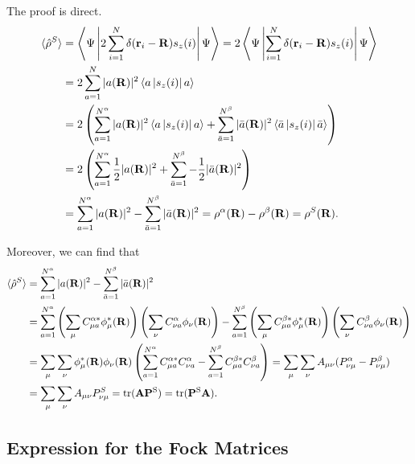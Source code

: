 \documentclass[a4paper]{book}
\newcounter{solution}[chapter]
\newcommand\tr[1]{\mathrm{tr(#1)}}
\newcommand{\bfR}{{\bf R}}
\begin{document}
	\begin{solution}
	
	The proof is direct.
	\begin{align*}
		\langle \hat{\rho}^S \rangle &= \left\langle \Psi \left| 2 \sum_{i=1}^N \delta( {\bf r}_i - {\bf R} )s_z(i) \right| \Psi \right\rangle = 2 \left\langle \Psi \left| \sum_{i=1}^N \delta( {\bf r}_i - {\bf R} )s_z(i) \right| \Psi \right\rangle \\
		&= 2 \sum_{ a=1 }^N | a( \bfR ) |^2 \left\langle a \left| s_z(i) \right| a \right\rangle \\
		&= 2 \left( \sum_{ a=1 }^{N^\alpha} | a( \bfR ) |^2 \left\langle a \left| s_z(i) \right| a \right\rangle + \sum_{ \bar{a}=1 }^{N^\beta} | \bar{a}( \bfR ) |^2 \left\langle \bar{a} \left| s_z(i) \right| \bar{a} \right\rangle \right) \\
		&= 2 \left( \sum_{ a=1 }^{N^\alpha} \frac{1}{2} | a( \bfR ) |^2 + \sum_{ \bar{a}=1 }^{N^\beta} -\frac{1}{2} | \bar{a}( \bfR ) |^2 \right) \\
		&= \sum_{ a=1 }^{N^\alpha} | a( \bfR ) |^2 - \sum_{ \bar{a}=1 }^{N^\beta} | \bar{a}( \bfR ) |^2 = \rho^\alpha ( \bfR ) - \rho^\beta ( \bfR ) = \rho^S ( \bfR ) .
	\end{align*}
	
	Moreover, we can find that
	\begin{align*}
		\langle \hat{\rho}^S \rangle &= \sum_{ a=1 }^{N^\alpha} | a( \bfR ) |^2 - \sum_{ \bar{a}=1 }^{N^\beta} | \bar{a}( \bfR ) |^2 \\
		&= \sum_{ a=1 }^{N^\alpha} \left( \sum_\mu C^{\alpha*}_{\mu a} \phi^*_\mu( \bfR ) \right) \left( \sum_\nu C^\alpha_{\nu a} \phi_\nu( \bfR ) \right) - \sum_{ a=1 }^{N^\beta} \left( \sum_\mu C^{\beta*}_{\mu a} \phi^*_\mu( \bfR ) \right) \left( \sum_\nu C^\beta_{\nu a} \phi_\nu( \bfR ) \right) \\
		&= \sum_\mu \sum_\nu \phi^*_\mu( \bfR ) \phi_\nu( \bfR ) \left( \sum_{ a=1 }^{N^\alpha} C^{\alpha*}_{\mu a} C^\alpha_{\nu a} - \sum_{ a=1 }^{N^\beta} C^{\beta*}_{\mu a} C^\beta_{\nu a} \right) = \sum_\mu \sum_\nu A_{\mu \nu} ( P^\alpha_{\nu \mu} - P^\beta_{\nu \mu} ) \\
		&= \sum_\mu \sum_\nu A_{\mu \nu} P^S_{\nu \mu} = \tr{ {\bf A} {\bf P}^S } = \tr{ {\bf P}^S {\bf A} } .
	\end{align*}
	
	\end{solution}
	
	\subsection{Expression for the Fock Matrices}
	
\end{document}
